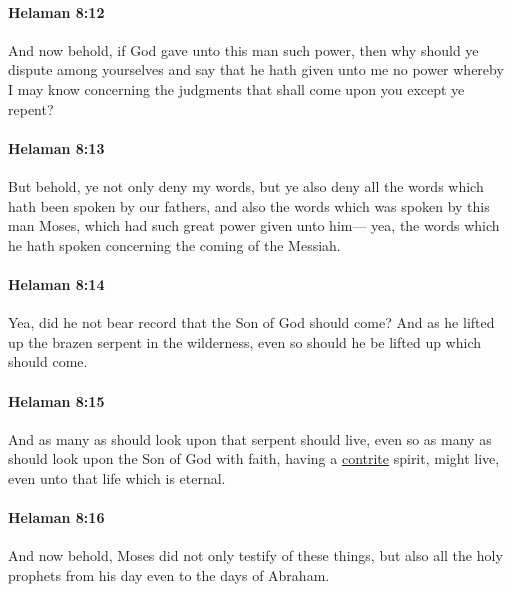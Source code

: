 		\paragraph{Helaman 8:12} %
			\label{HELAMAN-8-12}

			And now behold, if God gave unto this man such power,
			then why should ye dispute among yourselves
			and say that he hath given unto me no power
			whereby I may know concerning the judgments
			that shall come upon you except ye repent?

		\paragraph{Helaman 8:13} %
			\label{HELAMAN-8-13}

			But behold, ye not only deny my words,
			but ye also deny all the words which hath been spoken by our fathers,
			and also the words which was spoken by this man Moses,
			which had such great power given unto him---
			yea, the words which he hath spoken concerning the coming of the Messiah.

		\paragraph{Helaman 8:14} %
			\label{HELAMAN-8-14}

			Yea, did he not bear record that the Son of God should come?
			And as he lifted up the brazen serpent in the wilderness,
			even so should he be lifted up which should come.

		\paragraph{Helaman 8:15} %
			\label{HELAMAN-8-15}

			And as many as should look upon that serpent should live,
			even so as many as should look upon the Son of God with faith,
			having a \hyperref[CONTRITE]{contrite} spirit, might live,
			even unto that life which is eternal.

		\paragraph{Helaman 8:16} %
			\label{HELAMAN-8-16}

			And now behold, Moses did not only testify of these things,
			but also all the holy prophets from his day even to the days of Abraham.

